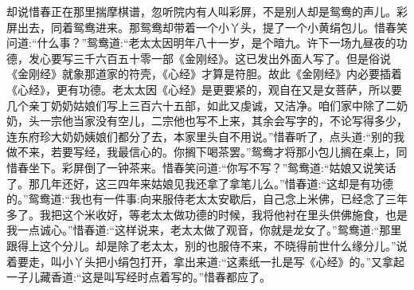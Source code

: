 


\begin{parag}
    却说惜春正在那里揣摩棋谱，忽听院内有人叫彩屏，不是别人却是鸳鸯的声儿。彩屏出去，同着鸳鸯进来。那鸳鸯却带着一个小丫头，提了一个小黄绢包儿。惜春笑问道:“什么事？”鸳鸯道:“老太太因明年八十一岁，是个暗九。许下一场九昼夜的功德，发心要写三千六百五十零一部《金刚经》。这已发出外面人写了。但是俗说《金刚经》就象那道家的符壳，《心经》才算是符胆。故此《金刚经》内必要插着《心经》，更有功德。老太太因《心经》是更要紧的，观自在又是女菩萨，所以要几个亲丁奶奶姑娘们写上三百六十五部，如此又虔诚，又洁净。咱们家中除了二奶奶，头一宗他当家没有空儿，二宗他也写不上来，其余会写字的，不论写得多少，连东府珍大奶奶姨娘们都分了去，本家里头自不用说。”惜春听了，点头道:“别的我做不来，若要写经，我最信心的。你搁下喝茶罢。”鸳鸯才将那小包儿搁在桌上，同惜春坐下。彩屏倒了一钟茶来。惜春笑问道:“你写不写？”鸳鸯道:“姑娘又说笑话了。那几年还好，这三四年来姑娘见我还拿了拿笔儿么。”惜春道:“这却是有功德的。”鸳鸯道:“我也有一件事:向来服侍老太太安歇后，自己念上米佛，已经念了三年多了。我把这个米收好，等老太太做功德的时候，我将他衬在里头供佛施食，也是我一点诚心。”惜春道:“这样说来，老太太做了观音，你就是龙女了。”鸳鸯道:“那里跟得上这个分儿。却是除了老太太，别的也服侍不来，不晓得前世什么缘分儿。”说着要走，叫小丫头把小绢包打开，拿出来道:“这素纸一扎是写《心经》的。”又拿起一子儿藏香道:“这是叫写经时点着写的。”惜春都应了。
\end{parag}


